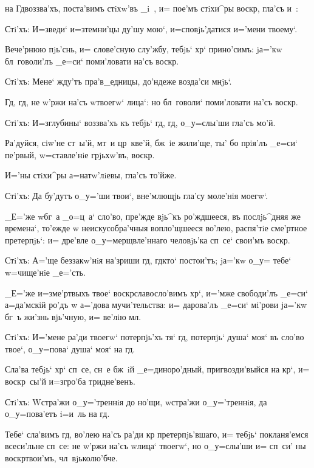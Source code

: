 
на Гд воззва'хъ, поста'вимъ стiхw'въ _i~, и= пое'мъ 
стiхи^ры воскр, гла'съ и~:

Стi'хъ: И=зведи` и=з\ъ темни'цы ду'шу мою`, 
и=сповjь'датися и='мени твоему`.

Вече'рнюю пjь'снь, и= слове'сную слу'жбу, тебjь` 
хр` прино'симъ: jа='кw бл~говоли'лъ _е=си` 
поми'ловати на'съ воскр.

Стi'хъ: Мене` жду'тъ пра'в_едницы, до'ндеже возда'си 
мнjь`.

Гд, гд, не w'ржи на'съ w\т твоегw` лица`: но 
бл~говоли` поми'ловати на'съ воскр.

Стi'хъ: И=з\ъ глубины` воззва'хъ къ тебjь` гд, 
гд, о_у=слы'ши гла'съ мо'й.

Ра'дуйся, сiw'не ст~ы'й, мт~и цр~кве'й, бж~iе жили'ще, 
ты' бо прiя'лъ _е=си` пе'рвый, w=ставле'нiе грjьхw'въ, 
воскр.

И='ны стiхи^ры а=натw'лiевы, гла'съ то'йже.

Стi'хъ: Да бу'дутъ о_у='ши твои`, вне'млющjь гла'су 
моле'нiя моегw`.

_Е='же w\т бг~а _о=ц~а` сло'во, пре'жде вjь^къ 
ро'ждшееся, въ послjь^дняя же времена`, то'ежде w\т 
неискусобра'чныя вопло'щшееся во'лею, распя'тiе сме'ртное 
претерпjь`: и= дре'вле о_у=мерщвле'ннаго человjь'ка 
сп~се` свои'мъ воскр.

Стi'хъ: А='ще беззакw'нiя на'зриши гд, гд кто` 
постои'тъ; jа='кw о_у= тебе` w=чище'нiе _е='сть.

_Е='же и=з\ъ ме'ртвыхъ твое` воскр славосло'вимъ 
хр`, и='мже свободи'лъ _е=си` а=да'мскiй ро'дъ w\т 
а='дова мучи'тельства: и= дарова'лъ _е=си` мi'рови jа='кw 
бг~ъ жи'знь вjь'чную, и= ве'лiю мл.

Стi'хъ: И='мене ра'ди твоегw` потерпjь'хъ тя` гд, 
потерпjь` душа` моя` въ сло'во твое`, о_у=пова` душа` 
моя` на гд.

Сла'ва тебjь` хр` сп~се, сн~е бж~iй 
_е=диноро'дный, пригвозди'выйся на кр`, и= 
воскр~сы'й и=з\ъ гро'ба тридне'венъ.

Стi'хъ: W\т стра'жи о_у='треннiя до но'щи, w\т стра'жи 
о_у='треннiя, да о_у=пова'етъ i=и~ль на гд.

Тебе` сла'вимъ гд, во'лею на'съ ра'ди кр 
претерпjь'вшаго, и= тебjь` покланя'емся всеси'льне сп~се: 
не w'ржи на'съ w\т лица` твоегw`, но о_у=слы'ши и= 
сп~си' ны воскр твои'мъ, чл~вjьколю'бче.

